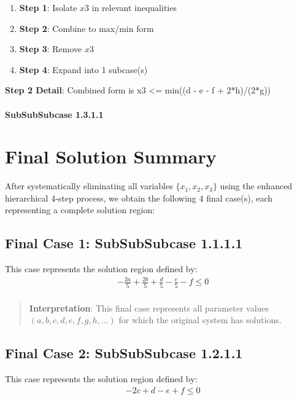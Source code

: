 \documentclass{article}
\newenvironment{stepdetail}
  {\begin{quote}\small\color{blue}}
  {\end{quote}}
\begin{document}
\begin{enumerate}
\item \textbf{Step 1}: Isolate $x3$ in relevant inequalities
\item \textbf{Step 2}: Combine to max/min form
\item \textbf{Step 3}: Remove $x3$
\item \textbf{Step 4}: Expand into 1 subcase(s)
\end{enumerate}

\textbf{Step 2 Detail}: Combined form is x3 <= min((d - e - f + 2*h)/(2*g))

\paragraph{SubSubSubcase 1.3.1.1}

\section{Final Solution Summary}

After systematically eliminating all variables $\{x_{1}, x_{2}, x_{3}\}$
using the enhanced hierarchical 4-step process, we obtain the following
4 final case(s), each representing a complete solution region:

\subsection{Final Case 1: SubSubSubcase 1.1.1.1}

This case represents the solution region defined by:
\begin{align}
& - \frac{2 a}{5} + \frac{2 b}{5} + \frac{d}{5} - \frac{e}{5} - f \leq 0 \\
\end{align}

\begin{stepdetail}
\textbf{Interpretation}: This final case represents all parameter values
$(a, b, c, d, e, f, g, h, \ldots)$ for which the original system has solutions.
\end{stepdetail}

\subsection{Final Case 2: SubSubSubcase 1.2.1.1}

This case represents the solution region defined by:
\begin{align}
& - 2 c + d - e + f \leq 0 \\
\end{align}
\end{document}

